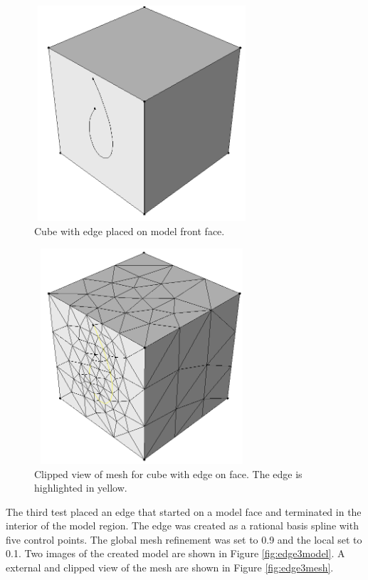 \documentclass[a4paper, 12pt]{article}
\begin{document}
\begin{figure}[H]
  \centering
  \includegraphics[width=8cm, height=8cm]{test7_smd}
  \caption{Cube with edge placed on model front face.}
  \label{fig:edge2model}
\end{figure}

\begin{figure}[H]
  \centering
  \includegraphics[width=8cm, height=8cm]{test7_sms}
  \caption{Clipped view of mesh for cube with edge on face. 
          The edge is highlighted in yellow.}
  \label{fig:edge2mesh}
\end{figure}

The third test placed an edge that started on a model face and 
terminated in the interior of the model region. 
The edge was created as a rational basis spline with five control points.
The global mesh refinement was set to 0.9 and the local set to 0.1. 
Two images of the created model are shown in Figure \ref{fig:edge3model}.
A external and clipped view of the mesh are 
shown in Figure \ref{fig:edge3mesh}.
\end{document}
